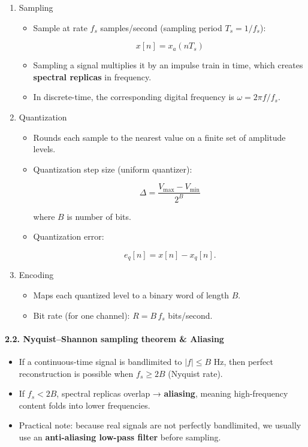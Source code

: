 \begin{enumerate}
\def\labelenumi{\arabic{enumi}.}
\tightlist
\item
  Sampling

  \begin{itemize}
  \item
    Sample at rate \(f_s\) samples/second (sampling period
    \(T_s=1/f_s\)):

    \[  
      x[n]=x_a(nT_s)  
      \]
  \item
    Sampling a signal multiplies it by an impulse train in time, which
    creates \textbf{spectral replicas} in frequency.
  \item
    In discrete-time, the corresponding digital frequency is
    \(\omega = 2\pi f/f_s\).
  \end{itemize}
\item
  Quantization

  \begin{itemize}
  \item
    Rounds each sample to the nearest value on a finite set of amplitude
    levels.
  \item
    Quantization step size (uniform quantizer):

    \[  
      \Delta = \frac{V_{\max}-V_{\min}}{2^B}  
      \]

    where \(B\) is number of bits.
  \item
    Quantization error:

    \[  
      e_q[n]=x[n]-x_q[n].  
      \]
  \end{itemize}
\item
  Encoding

  \begin{itemize}
  \tightlist
  \item
    Maps each quantized level to a binary word of length \(B\).
  \item
    Bit rate (for one channel): \(R = B\,f_s\) bits/second.
  \end{itemize}
\end{enumerate}

\paragraph{2.2. Nyquist--Shannon sampling theorem \&
Aliasing}\label{nyquistshannon-sampling-theorem-aliasing}

\begin{itemize}
\tightlist
\item
  If a continuous-time signal is bandlimited to \(|f|\le B\) Hz, then
  perfect reconstruction is possible when \(f_s \ge 2B\) (Nyquist rate).
\item
  If \(f_s < 2B\), spectral replicas overlap → \textbf{aliasing},
  meaning high-frequency content folds into lower frequencies.
\item
  Practical note: because real signals are not perfectly bandlimited, we
  usually use an \textbf{anti-aliasing low-pass filter} before sampling.
\end{itemize}

